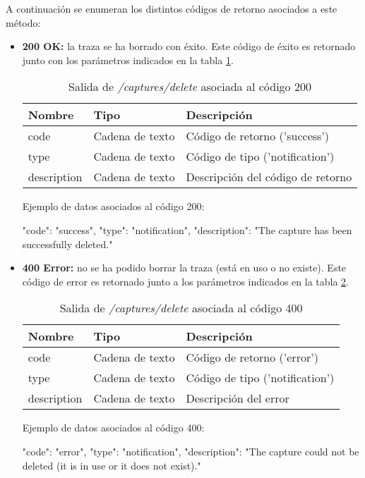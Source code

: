 A continuación se enumeran los distintos códigos de retorno asociados a este método:
\begin{itemize}

\item{\textbf{200 OK:} la \gls{traza} se ha borrado con éxito. Este código de éxito es retornado junto con los parámetros indicados en la tabla \ref{extra:api:capturesdelete:ok}.
\begin{table}[H]
\centering
\begin{tabular}{|l|l|l|}
\hline
\rowcolor[HTML]{F5F5F5}
\textbf{Nombre}  & \textbf{Tipo}   & \textbf{Descripción}              \\ \hline
code             & Cadena de texto & Código de retorno ('success')     \\ \hline
type             & Cadena de texto & Código de tipo ('notification')   \\ \hline
description      & Cadena de texto & Descripción del código de retorno \\ \hline
\end{tabular}
\caption{Salida de \textit{/captures/delete} asociada al código 200}
\label{extra:api:capturesdelete:ok}
\end{table}
\begin{minipage}{\textwidth}
Ejemplo de datos asociados al código 200:

\begin{code}[language=json]
{
  "code": "success",
  "type": "notification",
  "description": "The capture has been successfully deleted."
}
\end{code}
\end{minipage}
}

\item{\textbf{400 Error:} no se ha podido borrar la \gls{traza} (está en uso o no existe). Este código de error es retornado junto a los parámetros indicados en la tabla \ref{extra:api:capturesdelete:error}.
\begin{table}[H]
\centering
\begin{tabular}{|l|l|l|}
\hline
\rowcolor[HTML]{F5F5F5}
\textbf{Nombre}  & \textbf{Tipo}   & \textbf{Descripción}            \\ \hline
code             & Cadena de texto & Código de retorno ('error')     \\ \hline
type             & Cadena de texto & Código de tipo ('notification') \\ \hline
description      & Cadena de texto & Descripción del error           \\ \hline
\end{tabular}
\caption{Salida de \textit{/captures/delete} asociada al código 400}
\label{extra:api:capturesdelete:error}
\end{table}
\begin{minipage}{\textwidth}
Ejemplo de datos asociados al código 400:

\begin{code}[language=json]
{
  "code": "error",
  "type": "notification",
  "description": "The capture could not be deleted (it is in use or it does not exist)."
}
\end{code}
\end{minipage}
}
\end{itemize}